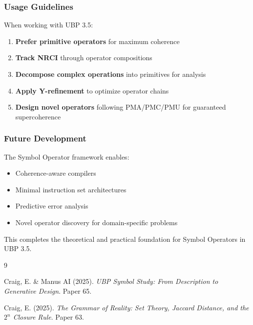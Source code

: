 \subsubsection{Usage Guidelines}

When working with UBP 3.5:

\begin{enumerate}
    \item \textbf{Prefer primitive operators} for maximum coherence
    \item \textbf{Track NRCI} through operator compositions
    \item \textbf{Decompose complex operations} into primitives for analysis
    \item \textbf{Apply Y-refinement} to optimize operator chains
    \item \textbf{Design novel operators} following PMA/PMC/PMU for guaranteed supercoherence
\end{enumerate}

\subsubsection{Future Development}

The Symbol Operator framework enables:

\begin{itemize}
    \item Coherence-aware compilers
    \item Minimal instruction set architectures
    \item Predictive error analysis
    \item Novel operator discovery for domain-specific problems
\end{itemize}

This completes the theoretical and practical foundation for Symbol Operators in UBP 3.5.

\begin{thebibliography}{9}

Craig, E. \& Manus AI (2025). \emph{UBP Symbol Study: From Description to Generative Design}. Paper 65.

Craig, E. (2025). \emph{The Grammar of Reality: Set Theory, Jaccard Distance, and the $2^n$ Closure Rule}. Paper 63.

\end{thebibliography}
